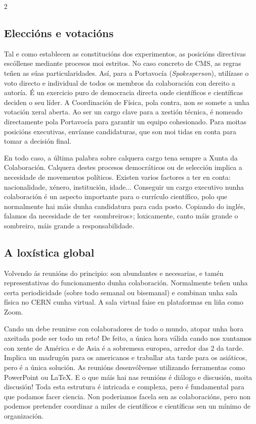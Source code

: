 \begin{multicols}{2}
\subsection*{Eleccións e votacións}

Tal e como establecen as constitucións dos experimentos, as posicións
directivas escóllense mediante procesos moi estritos. No caso concreto de CMS,
as regras teñen as súas particularidades. Así, para a Portavocía
(\textit{Spokesperson}), utilízase o voto directo e individual de todos os
membros da colaboración con dereito a autoría. É un exercicio puro de
democracia directa onde científicos e científicas deciden o seu líder. A
Coordinación de Física, pola contra, non se somete a unha votación xeral
aberta. Ao ser un cargo clave para a xestión técnica, é nomeado directamente
pola Portavocía para garantir un equipo cohesionado. Para moitas posicións
executivas, envíanse candidaturas, que son moi tidas en conta para tomar a
decisión final.

En todo caso, a última palabra sobre calquera cargo tena sempre a Xunta da
Colaboración. Calquera destes procesos democráticos ou de selección implica a
necesidade de movementos políticos. Existen varios factores a ter en conta:
nacionalidade, xénero, institución, idade... Conseguir un cargo executivo nunha
colaboración é un aspecto importante para o currículo científico, polo que
normalmente hai máis dunha candidatura para cada posto. Copiando do inglés,
falamos da necesidade de ter «sombreiros»; loxicamente, canto máis grande o
sombreiro, máis grande a %
responsabilidade.

\subsection*{A loxística global}

Volvendo ás reunións do principio: son abundantes e necesarias, e tamén
representativas do funcionamento dunha colaboración. Normalmente teñen unha
certa periodicidade (sobre todo semanal ou bisemanal) e combinan unha sala
física no CERN cunha virtual. A sala virtual faise en plataformas en liña como
Zoom.


Cando un debe reunirse con colaboradores de todo o mundo, atopar unha hora
axeitada pode ser todo un reto! De feito, a única hora válida cando nos
xuntamos con xente de América e de Asia é a sobremesa europea, arredor das 2 da
tarde. Implica un madrugón para os americanos e traballar ata tarde para os
asiáticos, pero é a única solución. As reunións desenvólvense utilizando
ferramentas como PowerPoint ou LaTeX. E o que máis hai nas reunións é diálogo e
discusión, moita discusión! Toda esta estrutura é intricada e complexa, pero é
fundamental para que podamos facer ciencia. Non poderiamos facela sen as
colaboracións, pero non podemos pretender coordinar a miles de científicos e
científicas sen un mínimo de organización.


\end{multicols}
